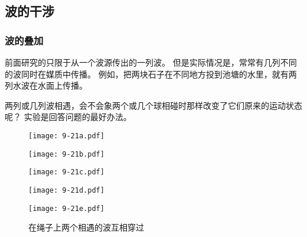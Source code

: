 \subsection{波的干涉}
\subsubsection{波的叠加} 

前面研究的只限于从一个波源传出的一列波。
但是实际情况是，常常有几列不同的波同时在媒质中传播。
例如，把两块石子在不同地方投到池塘的水里，就有两列水波在水面上传播。

两列或几列波相遇，会不会象两个或几个球相碰时那样改变了它们原来的运动状态呢？
实验是回答问题的最好办法。

\begin{figure}
  \begin{minipage}{0.1\linewidth} 
    \subcaption{}\label{fig:9-21a}
  \end{minipage}%
  \begin{minipage}{0.85\linewidth}
    \texttt{[image: 9-21a.pdf]}
  \end{minipage}\par\medskip
  \begin{minipage}{0.1\linewidth} 
    \subcaption{}\label{fig:9-21b}
  \end{minipage}%
  \begin{minipage}{0.85\linewidth}
    \texttt{[image: 9-21b.pdf]}
  \end{minipage}\par\bigskip
  \begin{minipage}{0.1\linewidth} 
    \subcaption{}\label{fig:9-21c}
  \end{minipage}%
  \begin{minipage}{0.85\linewidth}
    \texttt{[image: 9-21c.pdf]}
  \end{minipage}\par\medskip
  \begin{minipage}{0.1\linewidth} 
    \subcaption{}\label{fig:9-21d}
  \end{minipage}%
  \begin{minipage}{0.85\linewidth}
    \texttt{[image: 9-21d.pdf]}
  \end{minipage}\par\medskip
  \begin{minipage}{0.1\linewidth} 
    \subcaption{}\label{fig:9-21e}
  \end{minipage}%
  \begin{minipage}{0.85\linewidth}
    \texttt{[image: 9-21e.pdf]}
  \end{minipage}
  \caption{在绳子上两个相遇的波互相穿过}\label{fig:9-21}
\end{figure}

